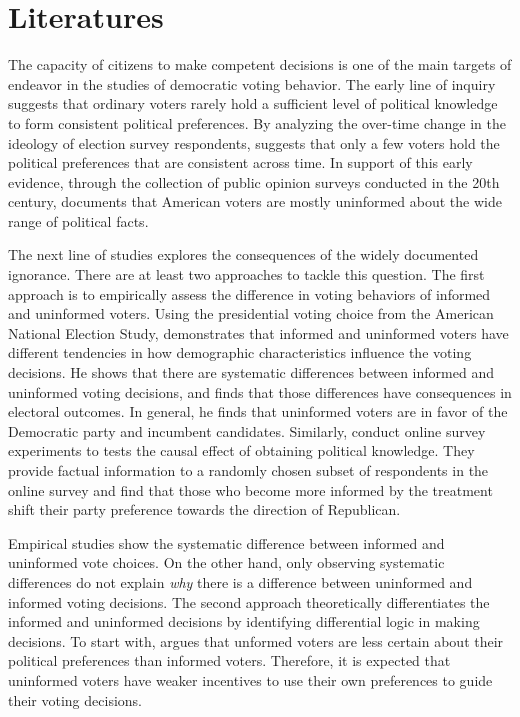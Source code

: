 \documentclass[doc,natbib,12pt]{apa6}\usepackage[]{graphicx}\usepackage[]{color}
\begin{document}
    \section{Literatures}
    
    \par The capacity of citizens to make competent decisions is one of the main targets of endeavor in the studies of democratic voting behavior. The early line of inquiry suggests that ordinary voters rarely hold a sufficient level of political knowledge to form consistent political preferences. By analyzing the over-time change in the ideology of election survey respondents, \cite{Converse1964thna} suggests that only a few voters hold the political preferences that are consistent across time. In support of this early evidence, through the collection of public opinion surveys conducted in the 20th century, \cite{Dellicarpini1996wham} documents that American voters are mostly uninformed about the wide range of political facts.
    
    \par The next line of studies explores the consequences of the widely documented ignorance. There are at least two approaches to tackle this question. The first approach is to empirically assess the difference in voting behaviors of informed and uninformed voters. Using the presidential voting choice from the American National Election Study, \cite{Bartels1996unvo} demonstrates that informed and uninformed voters have different tendencies in how demographic characteristics influence the voting decisions. He shows that there are systematic differences between informed and uninformed voting decisions, and finds that those differences have consequences in electoral outcomes. In general, he finds that uninformed voters are in favor of the Democratic party and incumbent candidates. Similarly, \cite{Fowler2014thpo} conduct online survey experiments to tests the causal effect of obtaining political knowledge. They provide factual information to a randomly chosen subset of respondents in the online survey and find that those who become more informed by the treatment shift their party preference towards the direction of Republican. 
    
    \par Empirical studies show the systematic difference between informed and uninformed vote choices. On the other hand, only observing systematic differences do not explain \textit{why} there is a difference between uninformed and informed voting decisions. The second approach theoretically differentiates the informed and uninformed decisions by identifying differential logic in making decisions. To start with, \cite{Matsusaka1995exvo} argues that unformed voters are less certain about their political preferences than informed voters. Therefore, it is expected that uninformed voters have weaker incentives to use their own preferences to guide their voting decisions. 
    
\end{document}
